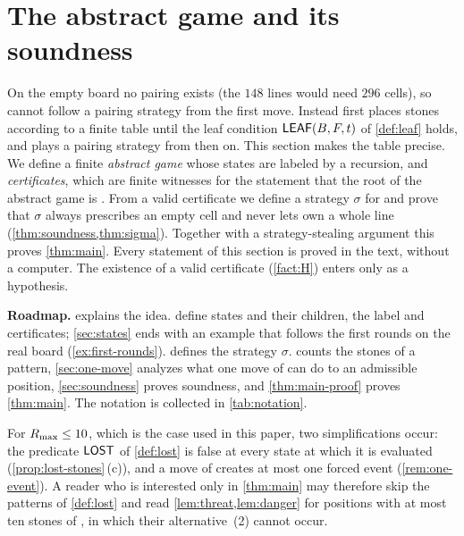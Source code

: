 
\section{The abstract game and its soundness}\label{sec:game}

On the empty board no pairing exists (the $148$ lines would need $296$ cells), so \Breaker{} cannot follow a
pairing strategy from the first move. Instead \Breaker{} first places stones according to a finite table until
the leaf condition $\mathsf{LEAF}(B,F,t)$ of \cref{def:leaf} holds, and plays a pairing strategy from then
on. This section makes the table precise. We define a finite \emph{abstract game} whose states are labeled
\WON{} by a recursion, and \emph{certificates}, which are finite witnesses for the statement that the root of
the abstract game is \WON. From a valid certificate we define a strategy $\sigma$ for \Breaker{} and prove that
$\sigma$ always prescribes an empty cell and never lets \Maker{} own a whole line
(\cref{thm:soundness,thm:sigma}). Together with a strategy-stealing argument this proves
\cref{thm:main}. Every statement of this section is proved in the text, without a computer. The existence of a valid certificate
(\cref{fact:H}) enters only as a hypothesis.

\medskip\noindent\textbf{Roadmap.}
 explains the idea.  define states and their children, the
label \WON{} and certificates; \cref{sec:states} ends with an example that follows the first rounds on the
real board (\cref{ex:first-rounds}).  defines the strategy $\sigma$.
 counts the stones of a pattern, \cref{sec:one-move} analyzes what one move of \Maker{}
can do to an admissible position, \cref{sec:soundness} proves soundness, and \cref{thm:main-proof} proves \cref{thm:main}. The notation is
collected in \cref{tab:notation}.

For $R_{\max}\le 10$, which is the case used in this paper, two simplifications occur: the predicate
$\mathsf{LOST}$ of \cref{def:lost} is false at every state at which it is evaluated
(\cref{prop:lost-stones}\,(c)), and a move of \Maker{} creates at most one forced event
(\cref{rem:one-event}). A reader who is interested only in \cref{thm:main} may therefore skip the patterns of
\cref{def:lost} and read \cref{lem:threat,lem:danger} for positions with at most ten stones of \Maker, in
which their alternative~(2) cannot occur.

